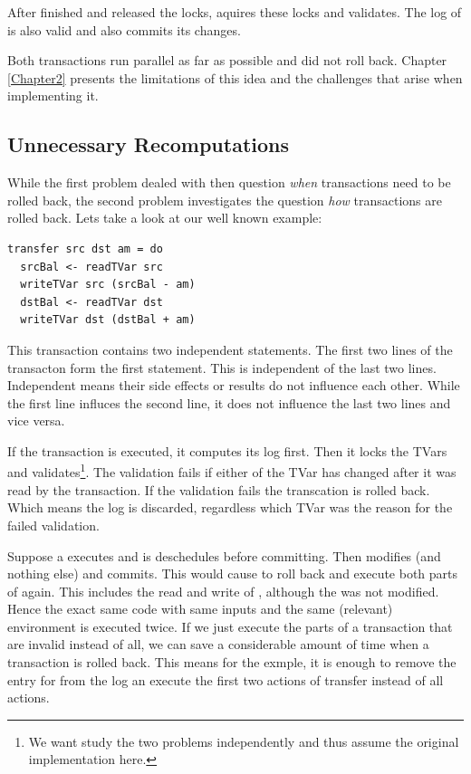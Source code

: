 After  finished and released the locks,  aquires these locks
and validates. The log of  is also valid and also commits its changes.

Both transactions run parallel as far as possible and did not roll back. Chapter \ref{Chapter2}
presents the limitations of this idea and the challenges that arise when implementing it.

\subsection{Unnecessary Recomputations}
\label{Prob:UnRe} 	
While the first problem dealed with then question \textit{when} transactions need to be rolled back,
the second problem investigates the question \textit{how} transactions are rolled back. Lets take a 
look at our well known example:
\begin{lstlisting}
transfer src dst am = do 
  srcBal <- readTVar src	
  writeTVar src (srcBal - am)	
  dstBal <- readTVar dst	
  writeTVar dst (dstBal + am)	
\end{lstlisting}
This transaction contains two independent statements. The first two lines of the transacton form the first 
statement. This is independent of the last two lines. Independent means their side effects or results do not 
influence each other. While the first line influces the second line, it does not influence the last two lines
and vice versa. 

If the transaction is executed, it computes its log first. Then it locks the TVars and 
validates\footnote{We want study the two problems independently and thus assume the original implementation here.}. 
The validation fails if either of the TVar has changed after it was read by the transaction.
If the validation fails the transcation is rolled back. Which means the log is discarded,
regardless which TVar was the reason for the failed validation. 

Suppose a  executes  and is deschedules before committing.
Then  modifies  (and nothing else) and commits. This would cause 
to roll back and execute both parts of  again. This includes the read and write of , although 
the  was not modified. Hence the exact same code with same inputs and the same (relevant) environment 
is executed twice. If we just execute the parts of a transaction that are invalid instead of all, we can save a 
considerable amount of time when a transaction is rolled back. This means for the exmple, it is enough to remove 
the entry for  from the log an execute the first two actions of transfer instead of all actions.

